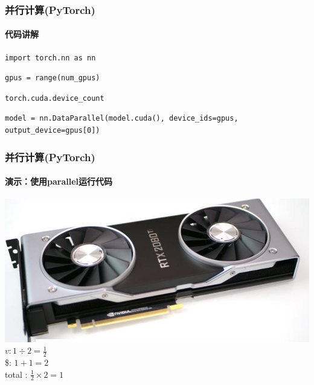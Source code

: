 \documentclass[10pt]{beamer}
\begin{document}
        \begin{frame}[fragile]
            \frametitle{并行计算(PyTorch)}
                \framesubtitle{代码讲解}
                    \begin{lstlisting}[basicstyle=\small]
import torch.nn as nn
                    \end{lstlisting}
                    \begin{lstlisting}[basicstyle=\small]
gpus = range(num_gpus)
                    \end{lstlisting}
                    \begin{lstlisting}[basicstyle=\small]
torch.cuda.device_count
                    \end{lstlisting}
                    \begin{lstlisting}[basicstyle=\small]
model = nn.DataParallel(model.cuda(), device_ids=gpus, output_device=gpus[0]) 
                    \end{lstlisting}

        \end{frame}


        \begin{frame}[fragile]
            \frametitle{并行计算(PyTorch)}
                \framesubtitle{演示：使用parallel运行代码}
                    \centering
                    \includegraphics[width=\linewidth]{src/img/RTX2080.jpeg}
                    {\small  $ v: 1 \div 2 = \frac{1}{2} $ \\
                    \$: $ 1 + 1 = 2 $ \\ 
                    total : $ \frac{1}{2} \times 2 = 1 $}

        \end{frame}
\end{document}
